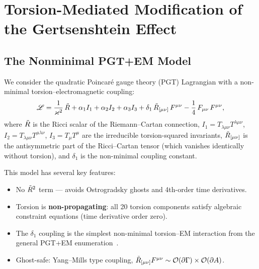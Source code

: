 %
%

\section{Torsion-Mediated Modification of the Gertsenshtein Effect}
\label{sec:torsion-modification}

\subsection{The Nonminimal PGT+EM Model}
\label{subsec:nonminimal-model}

We consider the quadratic Poincar\'e gauge theory (PGT) Lagrangian with a non-minimal torsion--electromagnetic coupling:
\begin{equation}
  \mathscr{L} = \frac{1}{\varkappa^2}\,\tilde{R}
    + \alpha_1 I_1 + \alpha_2 I_2 + \alpha_3 I_3
    + \delta_1\, \tilde{R}_{[\mu\nu]}\, F^{\mu\nu}
    - \frac{1}{4}\, F_{\mu\nu}\, F^{\mu\nu},
  \label{eq:nonminimal-lagrangian}
\end{equation}
where $\tilde{R}$ is the Ricci scalar of the Riemann--Cartan connection, $I_1 = T_{\lambda\mu\nu} T^{\lambda\mu\nu}$, $I_2 = T_{\lambda\mu\nu} T^{\mu\lambda\nu}$, $I_3 = T_\mu T^\mu$ are the irreducible torsion-squared invariants, $\tilde{R}_{[\mu\nu]}$ is the antisymmetric part of the Ricci--Cartan tensor (which vanishes identically without torsion), and $\delta_1$ is the non-minimal coupling constant.

This model has several key features:
\begin{itemize}
  \item No $\tilde{R}^2$ term --- avoids Ostrogradsky ghosts and 4th-order time derivatives.
  \item Torsion is \textbf{non-propagating}: all 20 torsion components satisfy algebraic constraint equations (time derivative order zero).
  \item The $\delta_1$ coupling is the simplest non-minimal torsion--EM interaction from the general PGT+EM enumeration~\cite{shapiro2002torsion,bahamonde2025torsion}.
  \item Ghost-safe: Yang--Mills type coupling, $\tilde{R}_{[\mu\nu]} F^{\mu\nu} \sim \mathcal{O}(\partial\Gamma) \times \mathcal{O}(\partial A)$.
\end{itemize}

